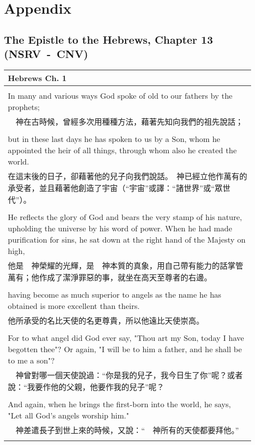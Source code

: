 \chapter*{Appendix}
\section{The Epistle to the Hebrews, Chapter 13 (NSRV~-~CNV)}
\footnotesize
\begin{tabularx}{\textwidth}{p{}}
\hline
Hebrews Ch. 1 \\
\hline \\
In many and various ways God spoke of old to our fathers by the prophets; \\
 　神在古時候，曾經多次用種種方法，藉著先知向我們的祖先說話； \\ \\
but in these last days he has spoken to us by a Son, whom he appointed the heir of all things, through whom also he created the world. \\
 在這末後的日子，卻藉著他的兒子向我們說話。　神已經立他作萬有的承受者，並且藉著他創造了宇宙（“宇宙”或譯：“諸世界”或“眾世代”）。 \\ \\
He reflects the glory of God and bears the very stamp of his nature, upholding the universe by his word of power. When he had made purification for sins, he sat down at the right hand of the Majesty on high, \\
 他是　神榮耀的光輝，是　神本質的真象，用自己帶有能力的話掌管萬有；他作成了潔淨罪惡的事，就坐在高天至尊者的右邊。 \\ \\
having become as much superior to angels as the name he has obtained is more excellent than theirs. \\
 他所承受的名比天使的名更尊貴，所以他遠比天使崇高。 \\ \\
For to what angel did God ever say, "Thou art my Son, today I have begotten thee"? Or again, "I will be to him a father, and he shall be to me a son"? \\
 　神曾對哪一個天使說過：“你是我的兒子，我今日生了你”呢？或者說：“我要作他的父親，他要作我的兒子”呢？ \\ \\
And again, when he brings the first-born into the world, he says, "Let all God's angels worship him." \\
 　神差遣長子到世上來的時候，又說：“　神所有的天使都要拜他。” \\ \\

\end{tabularx}
